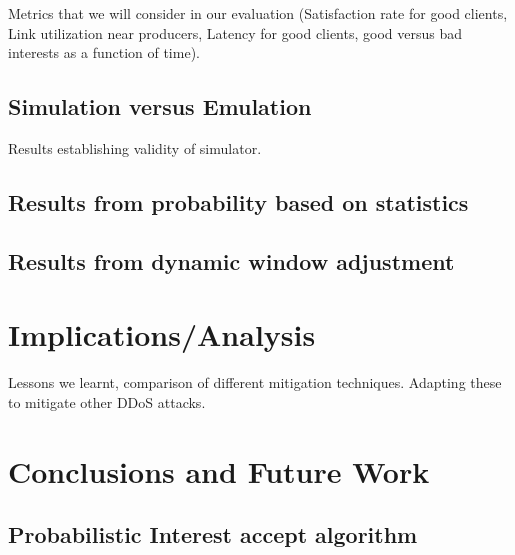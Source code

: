 \documentclass[conference]{IEEEtran}
\begin{document}
Metrics that we will consider in our evaluation (Satisfaction rate for good clients, Link utilization near producers, Latency for good clients, good versus bad interests as a function of time).

\subsection{Simulation versus Emulation}
Results establishing validity of  simulator.

\subsection{Results from probability based on statistics}

\subsection{Results from dynamic window adjustment}

\section{Implications/Analysis}
Lessons we learnt, comparison of different mitigation techniques. 
Adapting these to mitigate other DDoS attacks.

\section{Conclusions and Future Work}




\appendix








\subsection{Probabilistic Interest accept algorithm}
\end{document}
